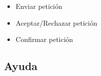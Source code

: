 \begin{itemize}

\item Enviar petición

\item Aceptar/Rechazar petición

\item Confirmar petición

\end{itemize}

\subsection{Ayuda}









